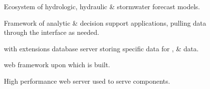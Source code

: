 \documentclass[letterpaper,10pt,english]{sphinxmanual}
\begin{document}
\begin{description}
\item[{{\hyperref[\detokenize{glossary:term-REON-WM}]{}}}] \leavevmode
\sphinxAtStartPar
Ecosystem of hydrologic, hydraulic \& stormwater forecast models.

\item[{{\hyperref[\detokenize{glossary:term-REON.cc}]{}}}] \leavevmode
\sphinxAtStartPar
Framework of {\hyperref[\detokenize{glossary:term-REON}]{}} analytic \& decision support applications, pulling data through the {\hyperref[\detokenize{glossary:term-GeoNode}]{}} {\hyperref[\detokenize{glossary:term-Django}]{}} interface as needed.

\item[{{\hyperref[\detokenize{glossary:term-REON-db}]{}}}] \leavevmode
\sphinxAtStartPar
{\hyperref[\detokenize{glossary:term-PostgreSQL}]{}} with {\hyperref[\detokenize{glossary:term-PostGIS}]{}} extensions database server storing {\hyperref[\detokenize{glossary:term-REON}]{}} specific data for {\hyperref[\detokenize{glossary:term-RTHS}]{}}, {\hyperref[\detokenize{glossary:term-REON-WM}]{}} \& {\hyperref[\detokenize{glossary:term-REON.cc}]{}} data.

\item[{{\hyperref[\detokenize{glossary:term-Django}]{}}}] \leavevmode
\sphinxAtStartPar
{\hyperref[\detokenize{glossary:term-Python}]{}} web framework upon which {\hyperref[\detokenize{glossary:term-GeoNode}]{}} is built.

\item[{{\hyperref[\detokenize{glossary:term-NGINX}]{}}}] \leavevmode
\sphinxAtStartPar
High performance web server used to serve {\hyperref[\detokenize{glossary:term-GeoNode}]{}} components.


\end{description}
\end{document}
